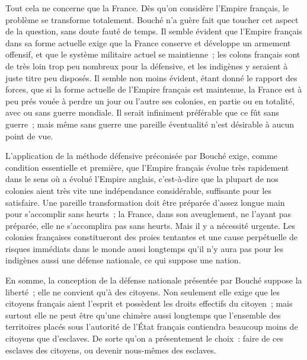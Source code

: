 \documentclass[french,twoside]{book} %
\begin{document}
Tout cela ne concerne que la France. Dès qu'on considère l'Empire fran­çais, le problème se transforme totalement. Bouché n'a guère fait que toucher cet aspect de la question, sans doute fauté de temps. Il semble évident que l'Empire français dans sa forme actuelle exige que la France conserve et développe un armement offensif, et que le système militaire actuel se main­tienne ; les colons français sont de très loin trop peu nombreux pour la défensive, et les indigènes y seraient à juste titre peu disposés. Il semble non moins évident, étant donné le rapport des forces, que si la forme actuelle de l'Empire français est maintenue, la France est à peu prés vouée à perdre un jour ou l'autre ses colonies, en partie ou en totalité, avec ou sans guerre mondiale. Il serait infiniment préférable que ce fût sans guerre ; mais même sans guerre une pareille éventualité n'est désirable à aucun point de vue.\par
L'application de la méthode défensive préconisée par Bouché exige, comme condition essentielle et première, que l'Empire français évolue très rapidement dans le sens où a évolué l'Empire anglais, c'est-à-dire que la plu­part de nos colonies aient très vite une indépendance considérable, suffisante pour les satisfaire. Une pareille transformation doit être préparée d'assez longue main pour s'accomplir sans heurts ; la France, dans son aveuglement, ne l'ayant pas préparée, elle ne s'accomplira pas sans heurts. Mais il y a nécessité urgente. Les colonies françaises constitueront des proies tentantes et une cause perpétuelle de risques immédiats dans le monde aussi longtemps qu'il n'y aura pas pour les indigènes aussi une défense nationale, ce qui suppose une nation.\par
En somme, la conception de la défense nationale présentée par Bouché suppose la liberté ; elle ne convient qu'à des citoyens. Non seulement elle exige que les citoyens français aient l'esprit et possèdent les droits effectifs du citoyen ; mais surtout elle ne peut être qu'une chimère aussi longtemps que l'ensemble des territoires placés sous l'autorité de l'État français contiendra beaucoup moins de citoyens que d'esclaves. De sorte qu'on a présentement le choix : faire de ces esclaves des citoyens, ou devenir nous-mêmes des esclaves.\par

\begin{center}
\noindent \centerline{}
\end{center}
\end{document}

